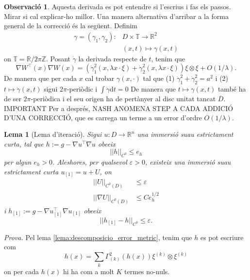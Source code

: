 \documentclass[11pt,a4paper,openright,oneside]{book}
\numberwithin{equation}{section}
\newtheorem{lema}[teo]{Lema}
\theoremstyle{definition}
\newtheorem{obs}[teo]{Observaci\'o}
\begin{document}
\begin{obs}
    {\color{blue} Aquesta derivada es pot entendre si l'escrius i fas els passos. Mirar si cal explicar-ho millor.}
    Una manera alternativa d'arribar a la forma general de la correcció és la següent. Definim 
    \begin{equation*}
        \begin{aligned}
        \gamma = (\gamma_1, \gamma_2) : &D\times \mathbb T\to \mathbb R^2\\
        & (x,t)\mapsto \gamma(x,t)
        \end{aligned}
    \end{equation*}
    on $\mathbb T = \mathbb R / 2\pi\mathbb Z$.
    Posant $\dot\gamma$ la derivada respecte de $t$, tenim que
    \begin{equation*}
        \nabla W ^{\intercal}(x) \nabla W(x) = \left( \dot\gamma_1^2(x, \lambda x\cdot\xi) + \dot\gamma_2^2(x, \lambda x\cdot\xi) \right)\xi\otimes\xi + O(1/\lambda).
    \end{equation*}
    De manera que per cada $x$ cal trobar $\gamma(x,\cdot)$ tal que 
    (1) $\dot\gamma_1^2 + \dot\gamma_2^2 = a^2$ i 
    (2) $t\mapsto \dot\gamma(x,t)$ sigui $2\pi$-periòdic i $\int\dot\gamma\text{d}t = 0$
    De manera que $t\mapsto\gamma(x,t)$ també ha de ser $2\pi$-periòdica i el seu origen ha de pertànyer al disc unitat tancat $\overline D$.
    {\color{blue} IMPORTANT Per a després, NASH ANOMENA STEP A CADA ADDICIÓ D'UNA CORRECCIÓ, que es carrega un terme a un error d'ordre $O(1/\lambda)$. }
\end{obs}
\begin{lema}[Lema d'iteració]\label{Lema_iteracio}
    Sigui $u:D\to\mathbb R^n$ una immersió suau estrictament curta, tal que $h:=g-\nabla u ^{\intercal}\nabla u$ obeeix
    \begin{equation}
        ||h||_{C^0} \le e_h
    \end{equation}
    per algun $e_h > 0$. Aleshores, per qualsevol $\varepsilon > 0$, existeix una immersió suau estrictament curta $u_{[1]} = u + U$, on
    \begin{equation}
        \begin{aligned}
        ||U||_{C^0(D)} &\le \varepsilon\\
        ||\nabla U||_{C^0(D)} &\le Ce_h^{1/2}
        \end{aligned}
    \end{equation}
    i $h_{[1]}:=g-\nabla u_{[1]}^{\intercal}\nabla u_{[1]}$ obeeix
    \begin{equation}
        ||h_{[1]}-h||_{C^0} \le \varepsilon.
    \end{equation}
\end{lema}
\textit{Prova.} Pel lema \ref{lema:descomposicio_error_metric}, tenim que $h$ es pot escriure com
\begin{equation*}
    h(x) = \sum_k \Gamma^2_{(k)}(h(x))\xi^{(k)}\otimes\xi^{(k)}
\end{equation*}
on per cada $h(x)$ hi ha com a molt $K$ termes no-nuls.
\end{document}
